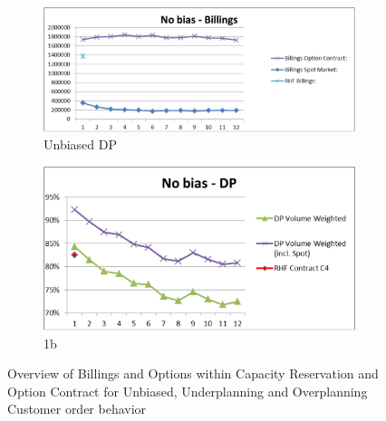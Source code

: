 \documentclass[12pt,english]{article}
\begin{document}
\begin{figure}
\begin{subfigure}{.5\textwidth}
  \centering
  \includegraphics[width=.8\linewidth]{Figures/Unbiased_Option_Contract.eps}
  \caption{Unbiased DP}
  \label{fig:sfig1}
\end{subfigure}%
\begin{subfigure}{.5\textwidth}
  \centering
  \includegraphics[width=.8\linewidth]{Figures/DP_Unbiased.eps}
  \caption{1b}
  \label{fig:sfig2}
\end{subfigure}
\caption{\label{fig:Overview-of-Option}Overview of Billings and Options within
 Capacity Reservation and Option Contract for Unbiased, Underplanning
 and Overplanning Customer order behavior}
\label{fig:fig}
\end{figure}
\end{document}
